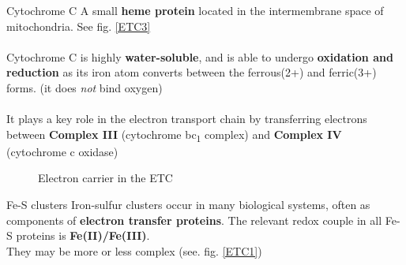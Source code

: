 \documentclass[../main.tex]{subfiles}
\begin{document}
\begin{RemarkWithTitel}{Cytochrome C}
	A small \textbf{heme protein} located in the intermembrane space of mitochondria. See fig. \ref{ETC3} \\
	\\
	Cytochrome C is highly \textbf{water-soluble}, and is able to undergo \textbf{oxidation and reduction} as its iron atom converts between the ferrous(2+) and ferric(3+) forms. (it does \textit{not} bind oxygen)\\
	\\
	It plays a key role in the electron transport chain by transferring electrons between \textbf{Complex III} (cytochrome bc\textsubscript{1} complex) and \textbf{Complex IV} (cytochrome c oxidase)
\end{RemarkWithTitel}

\begin{figure}[H]
	\centering
	\hfil
	\caption{Electron carrier in the ETC}
\end{figure}


\begin{DefWithTitle}{Fe-S clusters}
	Iron-sulfur clusters occur in many biological systems, often as components of \textbf{electron transfer proteins}. The relevant redox couple in all Fe-S proteins is\textbf{ Fe(II)/Fe(III)}. \\
	They may be more or less complex (see. fig. \ref{ETC1})
\end{DefWithTitle}
\end{document}

